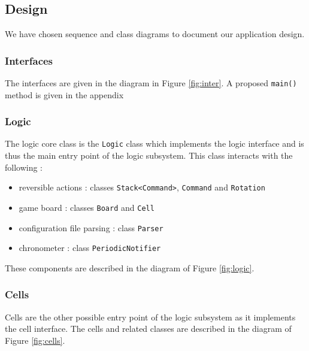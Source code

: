 \documentclass[a4paper,11pt]{article}
\begin{document}
\subsection{Design}
We have chosen sequence and class diagrams to document our application design. 
\subsubsection{Interfaces}
The interfaces are given in the diagram in Figure \ref{fig:inter}. A proposed \texttt{main()} method is given in the appendix 
\subsubsection{Logic}
The logic core class is the \texttt{Logic} class which implements the logic interface and is thus the main entry point of the logic subsystem. This class interacts with the following :
\begin{itemize}
	\item reversible actions : classes \texttt{Stack<Command>}, \texttt{Command} and \texttt{Rotation} 
	\item game board : classes \texttt{Board} and \texttt{Cell}
	\item configuration file parsing : class \texttt{Parser}
	\item chronometer : class \texttt{PeriodicNotifier}
\end{itemize}
These components are described in the diagram of Figure \ref{fig:logic}.
\subsubsection{Cells}
Cells are the other possible entry point of the logic subsystem as it implements the cell interface. The cells and related classes are described in the diagram of Figure \ref{fig:cells}.
\end{document}
